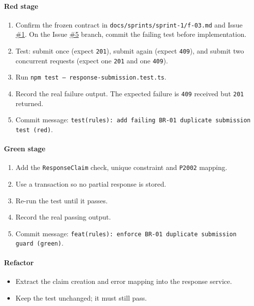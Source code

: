 \documentclass[12pt,a4paper]{article}
\begin{document}
\paragraph*{Red stage}
\begin{enumerate}[leftmargin=*]
\item Confirm the frozen contract in \texttt{docs/sprints/sprint-1/f-03.md} and Issue \href{https://github.com/Snnn3/SurveyHub/issues/1}{\#1}. On the Issue \href{https://github.com/Snnn3/SurveyHub/issues/5}{\#5} branch, commit the failing test before implementation.
\item Test: submit once (expect \texttt{201}), submit again (expect \texttt{409}), and submit two concurrent requests (expect one \texttt{201} and one \texttt{409}).
\item Run \texttt{npm test -- response-submission.test.ts}.
\item Record the real failure output. The expected failure is \texttt{409} received but \texttt{201} returned.
\item Commit message: \texttt{test(rules): add failing BR-01 duplicate submission test (red)}.
\end{enumerate}

\paragraph*{Green stage}
\begin{enumerate}[leftmargin=*]
\item Add the \texttt{ResponseClaim} check, unique constraint and \texttt{P2002} mapping.
\item Use a transaction so no partial response is stored.
\item Re-run the test until it passes.
\item Record the real passing output.
\item Commit message: \texttt{feat(rules): enforce BR-01 duplicate submission guard (green)}.
\end{enumerate}

\paragraph*{Refactor}
\begin{itemize}[leftmargin=*]
\item Extract the claim creation and error mapping into the response service.
\item Keep the test unchanged; it must still pass.
\end{itemize}
\end{document}
